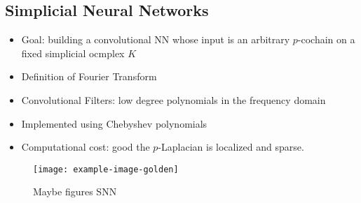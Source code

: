 \subsection{Simplicial Neural Networks}
\begin{itemize}
\item Goal: building a convolutional NN whose input is an arbitrary $p$-cochain on a fixed simplicial ocmplex $K$
\item  Definition of Fourier Transform
\item Convolutional Filters: low degree polynomials in the frequency domain
\item Implemented using Chebyshev polynomials
\item Computational cost: good the $p$-Laplacian is localized and sparse.
\end{itemize}

\begin{figure}[htbp]
  \centering
  
\texttt{[image: example-image-golden]}
  \caption{Maybe figures SNN} \label{fig:SNN}
\end{figure}